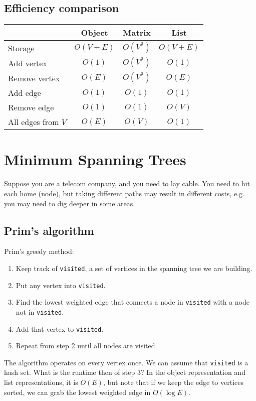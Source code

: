 \documentclass{article}
\begin{document}
\subsection{Efficiency comparison}

\begin{center}
\begin{tabular}{l|ccc}
 & Object & Matrix & List \\
\hline
Storage & $O(V+E)$ & $O(V^2)$ & $O(V+E)$ \\
Add vertex & $O(1)$ & $O(V^2)$ & $O(1)$ \\
Remove vertex & $O(E)$ & $O(V^2)$ & $O(E)$ \\
Add edge & $O(1)$ & $O(1)$ & $O(1)$ \\
Remove edge & $O(1)$ & $O(1)$ & $O(V)$ \\
All edges from $V$ & $O(E)$ & $O(V)$ & $O(1)$ 
\end{tabular}
\end{center}

\section{Minimum Spanning Trees}
Suppose you are a telecom company, and you need to lay cable.  You need to hit each home (node), but taking different paths may result in different costs, e.g. you may need to dig deeper in some areas.

\subsection{Prim's algorithm}
Prim's greedy method:
\begin{enumerate}
\item Keep track of \texttt{visited}, a set of vertices in the spanning tree we are building.
\item Put any vertex into \texttt{visited}.
\item Find the lowest weighted edge that connects a node in \texttt{visited} with a node not in \texttt{visited}.
\item Add that vertex to \texttt{visited}.
\item Repeat from step 2 until all nodes are visited.
\end{enumerate}

The algorithm operates on every vertex once.  We can assume that \texttt{visited} is a hash set.  What is the runtime then of step 3?  In the object representation and list representations, it is $O(E)$, but note that if we keep the edge to vertices sorted, we can grab the lowest weighted edge in $O(\log E)$.
\end{document}
